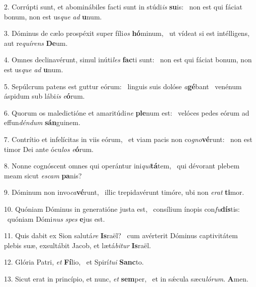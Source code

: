 2. Corrúpti sunt, et abominábiles facti sunt in stúdi\textit{is} \textbf{su}is: \ast\  non est qui fáciat bonum, non est us\textit{que} \textit{ad} \textbf{u}num.\

3. Dóminus de cælo prospéxit super fíli\textit{os} \textbf{hó}minum, \ast\  ut vídeat si est intélligens, aut re\textit{quí}\textit{rens} \textbf{De}um.\

4. Omnes declinavérunt, simul inúti\textit{les} \textbf{fac}ti sunt: \ast\  non est qui fáciat bonum, non est us\textit{que} \textit{ad} \textbf{u}num.\

5. Sepúlcrum patens est guttur eórum: \dag\  linguis suis dolóse \textit{a}\textbf{gé}bant \ast\  venénum áspidum sub lábi\textit{is} \textit{e}\textbf{ó}rum.\

6. Quorum os maledictióne et amaritúdi\textit{ne} \textbf{ple}num est: \ast\  velóces pedes eórum ad effun\textit{dén}\textit{dum} \textbf{sán}guinem.\

7. Contrítio et infelícitas in viis eórum, \dag\  et viam pacis non co\textit{gno}\textbf{vé}runt: \ast\  non est timor Dei ante ócu\textit{los} \textit{e}\textbf{ó}rum.\

8. Nonne cognóscent omnes qui operántur ini\textit{qui}\textbf{tá}tem, \ast\  qui dévorant plebem meam sicut \textit{es}\textit{cam} \textbf{pa}nis?\

9. Dóminum non invo\textit{ca}\textbf{vé}runt, \ast\  illic trepidavérunt timóre, ubi non \textit{e}\textit{rat} \textbf{ti}mor.\

10. Quóniam Dóminus in generatióne justa est, \dag\  consílium ínopis con\textit{fu}\textbf{dís}tis: \ast\  quóniam Dómi\textit{nus} \textit{spes} \textbf{e}jus est.\

11. Quis dabit ex Sion salutá\textit{re} \textbf{Is}raël? \ast\  cum avérterit Dóminus captivitátem plebis suæ, exsultábit Jacob, et lætá\textit{bi}\textit{tur} \textbf{Is}raël.\

12. Glória Patri, \textit{et} \textbf{Fí}lio, \ast\  et Spirí\textit{tu}\textit{i} \textbf{Sanc}to.\

13. Sicut erat in princípio, et nunc, \textit{et} \textbf{sem}per, \ast\  et in sǽcula sæcu\textit{ló}\textit{rum}. \textbf{A}men.\

